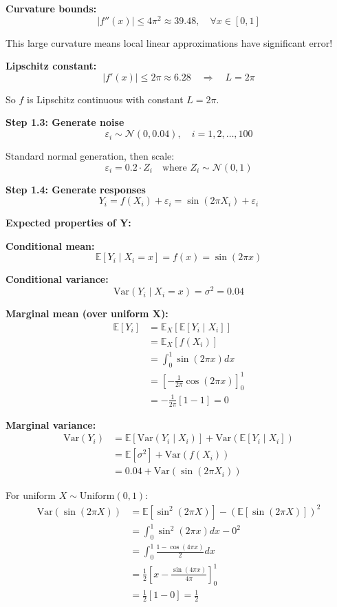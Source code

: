 \documentclass[12pt]{article}
\begin{document}
\begin{solution}
\textbf{Curvature bounds:}
\[
|f''(x)| \leq 4\pi^2 \approx 39.48, \quad \forall x \in [0,1]
\]

This large curvature means local linear approximations have significant error!

\textbf{Lipschitz constant:}
\[
|f'(x)| \leq 2\pi \approx 6.28 \quad \Rightarrow \quad L = 2\pi
\]

So $f$ is Lipschitz continuous with constant $L = 2\pi$.

\textbf{Step 1.3: Generate noise}
\[
\varepsilon_i \sim \mathcal{N}(0, 0.04), \quad i = 1, 2, \ldots, 100
\]

Standard normal generation, then scale:
\[
\varepsilon_i = 0.2 \cdot Z_i \quad \text{where } Z_i \sim \mathcal{N}(0,1)
\]

\textbf{Step 1.4: Generate responses}
\[
Y_i = f(X_i) + \varepsilon_i = \sin(2\pi X_i) + \varepsilon_i
\]

\textbf{Expected properties of Y:}

\textbf{Conditional mean:}
\[
\mathbb{E}[Y_i \mid X_i = x] = f(x) = \sin(2\pi x)
\]

\textbf{Conditional variance:}
\[
\text{Var}(Y_i \mid X_i = x) = \sigma^2 = 0.04
\]

\textbf{Marginal mean (over uniform X):}
\begin{align*}
\mathbb{E}[Y_i] &= \mathbb{E}_X[\mathbb{E}[Y_i \mid X_i]] \\
&= \mathbb{E}_X[f(X_i)] \\
&= \int_0^1 \sin(2\pi x)dx \\
&= \left[-\frac{1}{2\pi}\cos(2\pi x)\right]_0^1 \\
&= -\frac{1}{2\pi}[1 - 1] = 0
\end{align*}

\textbf{Marginal variance:}
\begin{align*}
\text{Var}(Y_i) &= \mathbb{E}[\text{Var}(Y_i \mid X_i)] + \text{Var}(\mathbb{E}[Y_i \mid X_i]) \\
&= \mathbb{E}[\sigma^2] + \text{Var}(f(X_i)) \\
&= 0.04 + \text{Var}(\sin(2\pi X_i))
\end{align*}

For uniform $X \sim \text{Uniform}(0,1)$:
\begin{align*}
\text{Var}(\sin(2\pi X)) &= \mathbb{E}[\sin^2(2\pi X)] - (\mathbb{E}[\sin(2\pi X)])^2 \\
&= \int_0^1 \sin^2(2\pi x)dx - 0^2 \\
&= \int_0^1 \frac{1 - \cos(4\pi x)}{2}dx \\
&= \frac{1}{2}\left[x - \frac{\sin(4\pi x)}{4\pi}\right]_0^1 \\
&= \frac{1}{2}[1 - 0] = \frac{1}{2}
\end{align*}


\end{solution}
\end{document}
